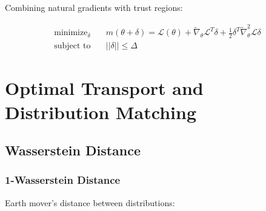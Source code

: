 \documentclass[11pt,letterpaper,openany]{book}
\newcommand{\minimize}{\operatorname{minimize}}
\newcommand{\subjectto}{\operatorname{subject\ to}}
\begin{document}
Combining natural gradients with trust regions:

\begin{align}
\minimize_{\delta} \quad & m(\theta + \delta) = \mathcal{L}(\theta) + \tilde{\nabla}_\theta \mathcal{L}^T \delta + \frac{1}{2} \delta^T \tilde{\nabla}^2_\theta \mathcal{L} \delta \\
\subjectto \quad & ||\delta|| \leq \Delta
\end{align}

\section{Optimal Transport and Distribution Matching}

\subsection{Wasserstein Distance}

\subsubsection{1-Wasserstein Distance}

Earth mover's distance between distributions:
\end{document}

